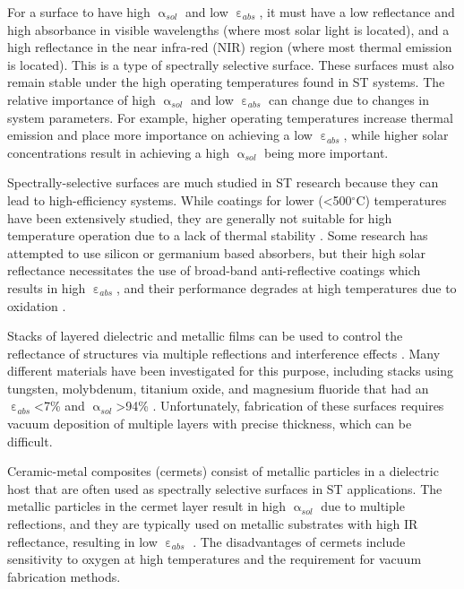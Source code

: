 \documentclass[10pt,letterpaper]{article}
\begin{document}
{For a surface to have high $\upalpha_{sol}$ and low $\upepsilon_{abs}$, it must have a low reflectance and high absorbance in visible wavelengths (where most solar light is located), and a high reflectance in the near infra-red (NIR) region (where most thermal emission is located).  This is a type of spectrally selective surface.  These surfaces must also remain stable under the high operating temperatures found in ST systems.  The relative importance of high $\upalpha_{sol}$ and low $\upepsilon_{abs}$ can change due to changes in system parameters.  For example, higher operating temperatures increase thermal emission and place more importance on achieving a low $\upepsilon_{abs}$, while higher solar concentrations result in achieving a high $\upalpha_{sol}$ being more important.

Spectrally-selective surfaces are much studied in ST research 
because they can lead to high-efficiency systems.  While coatings for lower (\textless500$^\circ$C) temperatures have been extensively studied, they are generally not suitable for high temperature operation due to a lack of thermal stability \cite{A1}.  Some research has attempted to use silicon or germanium based absorbers, but their high solar reflectance necessitates the use of broad-band anti-reflective coatings which results in high $\upepsilon_{abs}$, and their performance degrades at high temperatures due to oxidation \cite{A2}. 

Stacks of layered dielectric and metallic films can be used to control the reflectance of structures via multiple reflections and interference effects \cite{A3}.  Many different materials have been investigated for this purpose, including stacks using tungsten, molybdenum, titanium oxide, and magnesium fluoride that had an $\upepsilon_{abs}$\textless7\% and $\upalpha_{sol}$\textgreater94\% \cite{paper1_ref7,stacks2, A2}.  Unfortunately, fabrication of these surfaces requires vacuum deposition of multiple layers with precise thickness, which can be difficult.

Ceramic-metal composites (cermets) consist of metallic particles in a dielectric host that are often used as spectrally selective surfaces in ST applications.  The metallic particles in the cermet layer result in high $\upalpha_{sol}$ due to multiple reflections, and they are typically used on metallic substrates with high IR reflectance, resulting in low $\upepsilon_{abs}$ \cite{A2,A4,A5,A6,A7,A8,A9,A10}.  The disadvantages of cermets include sensitivity to oxygen at high temperatures and the requirement for vacuum fabrication methods.

}
\end{document}

